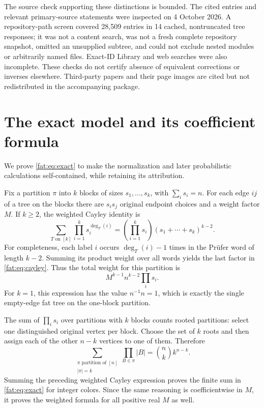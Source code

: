 \documentclass[11pt,letterpaper]{article}
\numberwithin{equation}{section}
\theoremstyle{remark}\newtheorem{remark}[theorem]{Remark}
\begin{document}
The source check supporting these distinctions is bounded. The cited entries and relevant primary-source statements were inspected on 4 October 2026. A repository-path screen covered 28,509 entries in 14 cached, nontruncated tree responses; it was not a content search, was not a fresh complete repository snapshot, omitted an unsupplied subtree, and could not exclude nested modules or arbitrarily named files. Exact-ID Library and web searches were also incomplete. These checks do not certify absence of equivalent corrections or inverses elsewhere. Third-party papers and their page images are cited but not redistributed in the accompanying package.

\section{The exact model and its coefficient formula}\label{fat:sec:model}
We prove \eqref{fat:eq:exact} to make the normalization and later probabilistic calculations self-contained, while retaining its attribution.

Fix a partition $\pi$ into $k$ blocks of sizes $s_1,\ldots,s_k$, with $\sum_i s_i=n$. For each edge $ij$ of a tree on the blocks there are $s_is_j$ original endpoint choices and a weight factor $M$. If $k\ge2$, the weighted Cayley identity is
\begin{equation}\label{fat:eq:cayley}
 \sum_{T\text{ on }[k]}\prod_{i=1}^k s_i^{\deg_T(i)}
 =\left(\prod_{i=1}^k s_i\right)(s_1+\cdots+s_k)^{k-2}.
\end{equation}
For completeness, each label $i$ occurs $\deg_T(i)-1$ times in the Pr\"ufer word of length $k-2$. Summing its product weight over all words yields the last factor in \eqref{fat:eq:cayley}. Thus the total weight for this partition is
\[
 M^{k-1}n^{k-2}\prod_i s_i.
\]
For $k=1$, this expression has the value $n^{-1}n=1$, which is exactly the single empty-edge fat tree on the one-block partition.

The sum of $\prod_i s_i$ over partitions with $k$ blocks counts rooted partitions: select one distinguished original vertex per block. Choose the set of $k$ roots and then assign each of the other $n-k$ vertices to one of them. Therefore
\[
 \sum_{\substack{\pi\text{ partition of }[n]\\|\pi|=k}}\prod_{B\in\pi}|B|
 =\binom nk k^{n-k}.
\]
Summing the preceding weighted Cayley expression proves the finite sum in \eqref{fat:eq:exact} for integer colors. Since the same reasoning is coefficientwise in $M$, it proves the weighted formula for all positive real $M$ as well.
\end{document}
